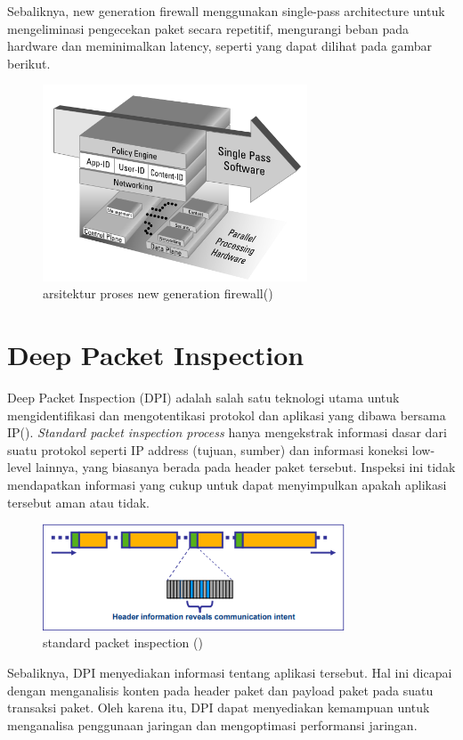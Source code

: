 Sebaliknya, new generation firewall menggunakan single-pass architecture untuk mengeliminasi pengecekan paket secara repetitif, mengurangi beban pada hardware dan meminimalkan latency, seperti yang dapat dilihat pada gambar berikut.

\begin{figure}[H]
	\centering
	\includegraphics[width=0.7\textwidth]{resources/architecture_NGFW.png}
	\caption{arsitektur proses new generation firewall(\cite{miller2011next})}
	\label{fig:architecture_NGFW}
\end{figure}

\section{Deep Packet Inspection}
Deep Packet Inspection (DPI) adalah salah satu teknologi utama untuk mengidentifikasi dan mengotentikasi protokol dan aplikasi yang dibawa bersama IP(\cite{allot2007digging}). \textit{Standard packet inspection process} hanya mengekstrak informasi dasar dari suatu protokol seperti IP address (tujuan, sumber) dan informasi koneksi low-level lainnya, yang biasanya berada pada header paket tersebut. Inspeksi ini tidak mendapatkan informasi yang cukup untuk dapat menyimpulkan apakah aplikasi tersebut aman atau tidak. 
\begin{figure}[H]
	\centering
	\includegraphics[width=0.8\textwidth]{resources/standard_inspection.png}
	\caption{standard packet inspection (\cite{allot2007digging})}
	\label{fig:standard_inspection}
\end{figure}
Sebaliknya, DPI menyediakan informasi tentang aplikasi tersebut. Hal ini dicapai dengan menganalisis konten pada header paket dan payload paket pada suatu transaksi paket. Oleh karena itu, DPI dapat menyediakan kemampuan untuk menganalisa penggunaan jaringan dan mengoptimasi performansi jaringan. 

